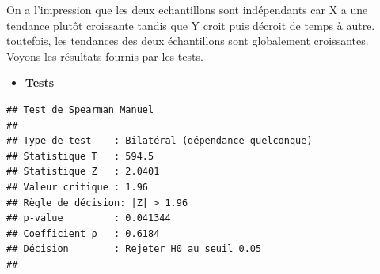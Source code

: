 \documentclass[
  12pt,
]{article}
\newenvironment{Shaded}{\begin{snugshade}}{\end{snugshade}}
\newcommand{\AlertTok}[1]{\textcolor[rgb]{0.94,0.16,0.16}{#1}}
\newcommand{\AttributeTok}[1]{\textcolor[rgb]{0.13,0.29,0.53}{#1}}
\newcommand{\CommentTok}[1]{\textcolor[rgb]{0.56,0.35,0.01}{\textit{#1}}}
\newcommand{\ConstantTok}[1]{\textcolor[rgb]{0.56,0.35,0.01}{#1}}
\newcommand{\FunctionTok}[1]{\textcolor[rgb]{0.13,0.29,0.53}{\textbf{#1}}}
\newcommand{\NormalTok}[1]{#1}
\newcommand{\OtherTok}[1]{\textcolor[rgb]{0.56,0.35,0.01}{#1}}
\newcommand{\SpecialCharTok}[1]{\textcolor[rgb]{0.81,0.36,0.00}{\textbf{#1}}}
\newcommand{\StringTok}[1]{\textcolor[rgb]{0.31,0.60,0.02}{#1}}
\providecommand{\tightlist}{%
  \setlength{\itemsep}{0pt}\setlength{\parskip}{0pt}}
\begin{document}
On a l'impression que les deux echantillons sont indépendants car X a
une tendance plutôt croissante tandis que Y croit puis décroit de temps
à autre. toutefois, les tendances des deux échantillons sont globalement
croissantes. Voyons les résultats fournis par les tests.

\begin{itemize}
\tightlist
\item
  \textbf{Tests}
\end{itemize}

\begin{Shaded}
\end{Shaded}

\begin{verbatim}
## Test de Spearman Manuel
## -----------------------
## Type de test    : Bilatéral (dépendance quelconque) 
## Statistique T   : 594.5 
## Statistique Z   : 2.0401 
## Valeur critique : 1.96 
## Règle de décision: |Z| > 1.96 
## p-value         : 0.041344 
## Coefficient ρ   : 0.6184 
## Décision        : Rejeter H0 au seuil 0.05 
## -----------------------
\end{verbatim}

\begin{Shaded}
\end{Shaded}
\end{document}
